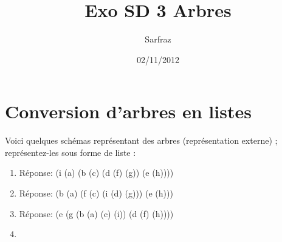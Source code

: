 \documentclass[a4paper, 11pt]{article}
\title{Exo SD 3 Arbres}
\author{Sarfraz \bsc{kapasi}}
\date{02/11/2012}
\begin{document}
%
\maketitle
%
\section{Conversion d'arbres en listes}
Voici quelques schémas représentant des arbres (représentation externe) ; représentez-les sous forme de liste :\\

\begin{enumerate}
  \item {}
Réponse: (i (a) (b (c) (d (f) (g)) (e (h))))
  \item {}
Réponse: (b (a) (f (c) (i (d) (g))) (e (h)))
  \item {}
Réponse: (e (g (b (a) (c) (i)) (d (f) (h))))
  \item {}

\end{enumerate}
\end{document}
